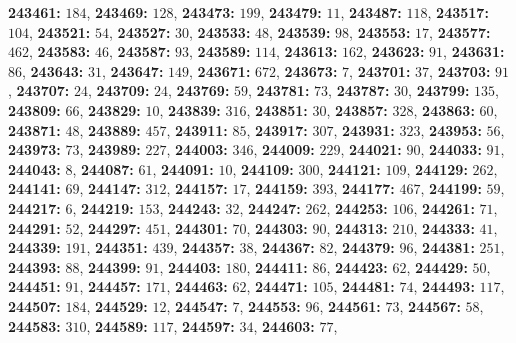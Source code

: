 \textsf{\bfseries 243461:} $184$, \textsf{\bfseries 243469:} $128$, \textsf{\bfseries 243473:} $199$, \textsf{\bfseries 243479:} $11$, \textsf{\bfseries 243487:} $118$, \textsf{\bfseries 243517:} $104$, \textsf{\bfseries 243521:} $54$, \textsf{\bfseries 243527:} $30$, \textsf{\bfseries 243533:} $48$, \textsf{\bfseries 243539:} $98$, \textsf{\bfseries 243553:} $17$, \textsf{\bfseries 243577:} $462$, \textsf{\bfseries 243583:} $46$, \textsf{\bfseries 243587:} $93$, \textsf{\bfseries 243589:} $114$, \textsf{\bfseries 243613:} $162$, \textsf{\bfseries 243623:} $91$, \textsf{\bfseries 243631:} $86$, \textsf{\bfseries 243643:} $31$, \textsf{\bfseries 243647:} $149$, \textsf{\bfseries 243671:} $672$, \textsf{\bfseries 243673:} $7$, \textsf{\bfseries 243701:} $37$, \textsf{\bfseries 243703:} $91$, \textsf{\bfseries 243707:} $24$, \textsf{\bfseries 243709:} $24$, \textsf{\bfseries 243769:} $59$, \textsf{\bfseries 243781:} $73$, \textsf{\bfseries 243787:} $30$, \textsf{\bfseries 243799:} $135$, \textsf{\bfseries 243809:} $66$, \textsf{\bfseries 243829:} $10$, \textsf{\bfseries 243839:} $316$, \textsf{\bfseries 243851:} $30$, \textsf{\bfseries 243857:} $328$, \textsf{\bfseries 243863:} $60$, \textsf{\bfseries 243871:} $48$, \textsf{\bfseries 243889:} $457$, \textsf{\bfseries 243911:} $85$, \textsf{\bfseries 243917:} $307$, \textsf{\bfseries 243931:} $323$, \textsf{\bfseries 243953:} $56$, \textsf{\bfseries 243973:} $73$, \textsf{\bfseries 243989:} $227$, \textsf{\bfseries 244003:} $346$, \textsf{\bfseries 244009:} $229$, \textsf{\bfseries 244021:} $90$, \textsf{\bfseries 244033:} $91$, \textsf{\bfseries 244043:} $8$, \textsf{\bfseries 244087:} $61$, \textsf{\bfseries 244091:} $10$, \textsf{\bfseries 244109:} $300$, \textsf{\bfseries 244121:} $109$, \textsf{\bfseries 244129:} $262$, \textsf{\bfseries 244141:} $69$, \textsf{\bfseries 244147:} $312$, \textsf{\bfseries 244157:} $17$, \textsf{\bfseries 244159:} $393$, \textsf{\bfseries 244177:} $467$, \textsf{\bfseries 244199:} $59$, \textsf{\bfseries 244217:} $6$, \textsf{\bfseries 244219:} $153$, \textsf{\bfseries 244243:} $32$, \textsf{\bfseries 244247:} $262$, \textsf{\bfseries 244253:} $106$, \textsf{\bfseries 244261:} $71$, \textsf{\bfseries 244291:} $52$, \textsf{\bfseries 244297:} $451$, \textsf{\bfseries 244301:} $70$, \textsf{\bfseries 244303:} $90$, \textsf{\bfseries 244313:} $210$, \textsf{\bfseries 244333:} $41$, \textsf{\bfseries 244339:} $191$, \textsf{\bfseries 244351:} $439$, \textsf{\bfseries 244357:} $38$, \textsf{\bfseries 244367:} $82$, \textsf{\bfseries 244379:} $96$, \textsf{\bfseries 244381:} $251$, \textsf{\bfseries 244393:} $88$, \textsf{\bfseries 244399:} $91$, \textsf{\bfseries 244403:} $180$, \textsf{\bfseries 244411:} $86$, \textsf{\bfseries 244423:} $62$, \textsf{\bfseries 244429:} $50$, \textsf{\bfseries 244451:} $91$, \textsf{\bfseries 244457:} $171$, \textsf{\bfseries 244463:} $62$, \textsf{\bfseries 244471:} $105$, \textsf{\bfseries 244481:} $74$, \textsf{\bfseries 244493:} $117$, \textsf{\bfseries 244507:} $184$, \textsf{\bfseries 244529:} $12$, \textsf{\bfseries 244547:} $7$, \textsf{\bfseries 244553:} $96$, \textsf{\bfseries 244561:} $73$, \textsf{\bfseries 244567:} $58$, \textsf{\bfseries 244583:} $310$, \textsf{\bfseries 244589:} $117$, \textsf{\bfseries 244597:} $34$, \textsf{\bfseries 244603:} $77$, 

